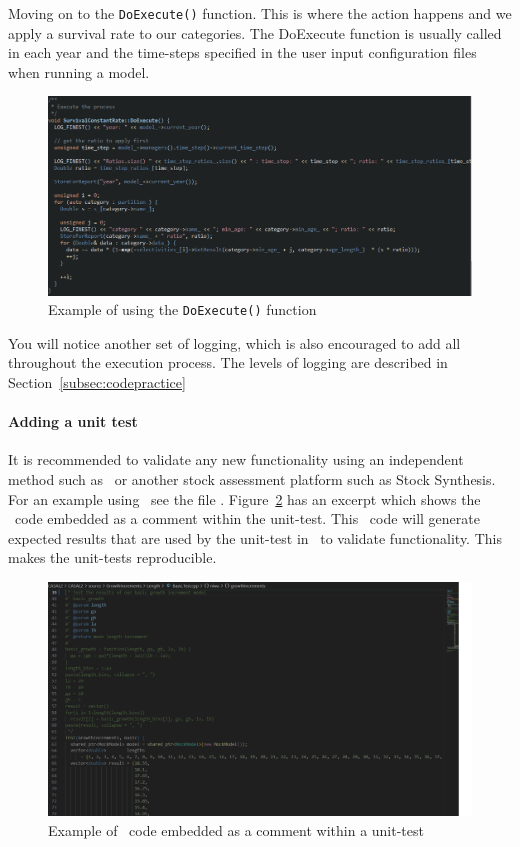 Moving on to the \texttt{DoExecute()} function. This is where the action happens and we apply a survival rate to our categories. The DoExecute function is usually called in each year and the time-steps specified in the user input configuration files when running a model.

\begin{figure}[H]
	\centering
	\includegraphics[scale=0.5]{Figures/execute.png}
	\caption{Example of using the \texttt{DoExecute()} function}\label{fig:execute}
\end{figure}

You will notice another set of logging, which is also encouraged to add all throughout the execution process. The levels of logging are described in Section~\ref{subsec:codepractice}


\paragraph*{Adding a unit test}

It is recommended to validate any new functionality using an independent method such as \R\ or another stock assessment platform such as Stock Synthesis. For an example using \R\ see the file . Figure~\ref{fig:unittest1} has an excerpt which shows the \R\ code embedded as a comment within the unit-test. This \R\ code will generate expected results that are used by the unit-test in \CNAME\ to validate functionality. This makes the unit-tests reproducible.

\begin{figure}[!ht]
	\centering
	\includegraphics[scale=0.38]{Figures/unittestWithR.png}
	\caption{Example of \R\ code embedded as a comment within a unit-test}\label{fig:unittest1}
\end{figure}


